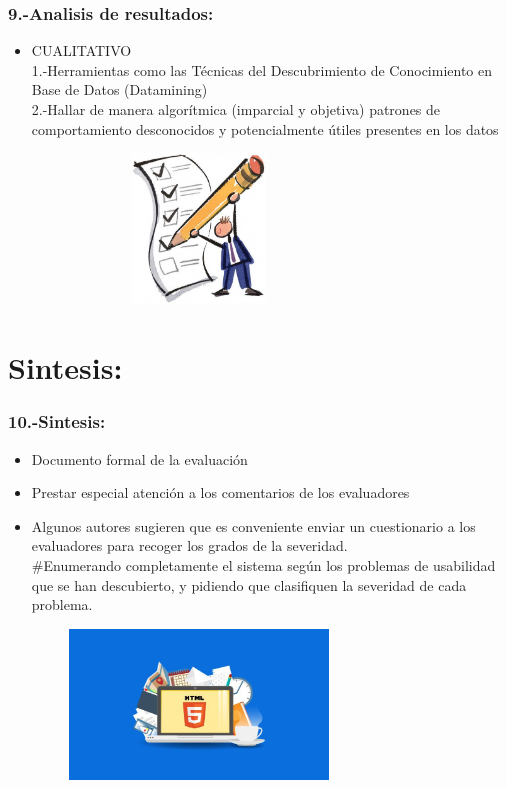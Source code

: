 \documentclass[11pt]{beamer}
\begin{document}
\begin{frame}
\frametitle{9.-Analisis de resultados:}

\begin{itemize}
\item CUALITATIVO\\ 1.-Herramientas como las Técnicas del Descubrimiento de Conocimiento en Base de Datos (Datamining)\\ 2.-Hallar de manera algorítmica (imparcial y objetiva) patrones de comportamiento desconocidos y potencialmente útiles presentes en los datos 
\end{itemize}
\begin{figure}
  \centering
  \includegraphics[width=8.0cm,height=4.0cm]{img/image_5.jpg}
\end{figure}
\end{frame}

\section{Sintesis:}
\begin{frame}
\frametitle{10.-Sintesis:}

\begin{itemize}
\item Documento formal de la evaluación
\item Prestar especial atención a los comentarios de los evaluadores
\item Algunos autores sugieren que es conveniente enviar un cuestionario a los evaluadores para recoger los grados de la severidad. \\ #Enumerando completamente el sistema según los problemas de usabilidad que se han descubierto, y pidiendo que clasifiquen la severidad de cada problema.
\end{itemize}

\begin{figure}
  \centering
  \includegraphics[width=8.0cm,height=4.0cm]{img/image_7.png}
\end{figure}
\end{frame}
\end{document}
